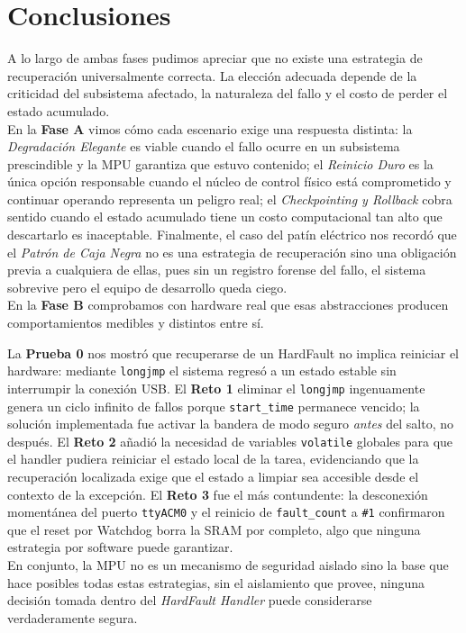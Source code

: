 \documentclass[12pt,letterpaper]{article}
\begin{document}
\section*{Conclusiones}
A lo largo de ambas fases pudimos apreciar que no existe una estrategia de recuperación universalmente correcta.
La elección adecuada depende de la criticidad del subsistema afectado, la naturaleza del fallo y el costo de
perder el estado acumulado.\\

En la \textbf{Fase A} vimos cómo cada escenario exige una respuesta distinta: la \textit{Degradación Elegante}
es viable cuando el fallo ocurre en un subsistema prescindible y la MPU garantiza que estuvo contenido; el
\textit{Reinicio Duro} es la única opción responsable cuando el núcleo de control físico está comprometido y
continuar operando representa un peligro real; el \textit{Checkpointing y Rollback} cobra sentido cuando el
estado acumulado tiene un costo computacional tan alto que descartarlo es inaceptable. Finalmente, el caso del
patín eléctrico nos recordó que el \textit{Patrón de Caja Negra} no es una estrategia de recuperación sino una
obligación previa a cualquiera de ellas, pues sin un registro forense del fallo, el sistema sobrevive pero el
equipo de desarrollo queda ciego.\\

En la \textbf{Fase B} comprobamos con hardware real que esas abstracciones producen comportamientos medibles y
distintos entre sí.

La \textbf{Prueba 0} nos mostró que recuperarse de un HardFault no implica reiniciar el
hardware: mediante \texttt{longjmp} el sistema regresó a un estado estable sin interrumpir la conexión USB.
El \textbf{Reto 1} eliminar el \texttt{longjmp} ingenuamente genera un ciclo infinito de fallos porque
\texttt{start\_time} permanece vencido; la solución implementada fue activar la bandera de modo seguro
\textit{antes} del salto, no después. El \textbf{Reto 2} añadió la necesidad de variables \texttt{volatile}
globales para que el handler pudiera reiniciar el estado local de la tarea, evidenciando que la recuperación
localizada exige que el estado a limpiar sea accesible desde el contexto de la excepción. El \textbf{Reto 3}
fue el más contundente: la desconexión momentánea del puerto \texttt{ttyACM0} y el reinicio de
\texttt{fault\_count} a \texttt{\#1} confirmaron que el reset por Watchdog borra la SRAM por completo, algo que
ninguna estrategia por software puede garantizar.\\

En conjunto, la MPU no es un mecanismo de seguridad aislado sino la base que hace posibles todas estas
estrategias, sin el aislamiento que provee, ninguna decisión tomada dentro del \textit{HardFault Handler} puede
considerarse verdaderamente segura.
\end{document}
